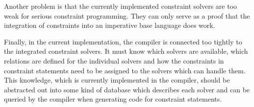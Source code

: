 Another problem is that the currently implemented constraint solvers
are too weak for serious constraint programming.  They can only serve
as a proof that the integration of constraints into an imperative base
language does work.

Finally, in the current implementation, the compiler is connected too
tightly to the integrated constraint solvers.  It must know which
solvers are available, which relations are defined for the individual
solvers and how the constraints in constraint statements need to be
assigned to the solvers which can handle them.  This knowledge, which
is currently implemented in the compiler, should be abstracted out
into some kind of database which describes each solver and can be
queried by the compiler when generating code for constraint
statements.


